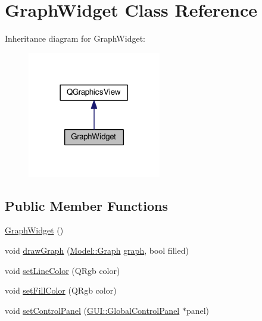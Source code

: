 \hypertarget{classGUI_1_1GraphWidget}{}\section{Graph\+Widget Class Reference}
\label{classGUI_1_1GraphWidget}


Inheritance diagram for Graph\+Widget\+:
\nopagebreak
\begin{figure}[H]
\begin{center}
\leavevmode
\includegraphics[width=165pt]{classGUI_1_1GraphWidget__inherit__graph}
\end{center}
\end{figure}
\subsection*{Public Member Functions}
\begin{DoxyCompactItemize}
\item 
\hyperlink{classGUI_1_1GraphWidget_a6d80d51caf0aee4c148baee49978f8c3}{Graph\+Widget} ()
\item 
void \hyperlink{classGUI_1_1GraphWidget_a25c17e8ca0168048e36c347f423ed017}{draw\+Graph} (\hyperlink{classModel_1_1Graph}{Model\+::\+Graph} \hyperlink{classGUI_1_1GraphWidget_ab3ea51551e457dd2373457329db2651e}{graph}, bool filled)
\item 
void \hyperlink{classGUI_1_1GraphWidget_ac7a4a8dd961c4b9c732ef22bfb4143ce}{set\+Line\+Color} (Q\+Rgb color)
\item 
void \hyperlink{classGUI_1_1GraphWidget_a7d8af579d2c285a372ec5bc60cbac4c1}{set\+Fill\+Color} (Q\+Rgb color)
\item 
void \hyperlink{classGUI_1_1GraphWidget_a7b9e0f55d4f00ec543cc714478104c80}{set\+Control\+Panel} (\hyperlink{classGUI_1_1GlobalControlPanel}{G\+U\+I\+::\+Global\+Control\+Panel} $\ast$panel)
\end{DoxyCompactItemize}
